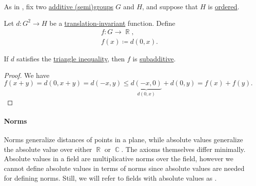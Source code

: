\begin{proposition}\label{thm:triangle_inequality_to_subadditivity}
  As in , fix two \hyperref[con:additive_semigroup]{additive (semi)groups} \( G \) and \( H \), and suppose that \( H \) is \hyperref[def:ordered_semigroup]{ordered}.

  Let \( d: G^2 \to H \) be a \hyperref[def:translation_invariant_binary_function]{translation-invariant} function. Define
  \begin{equation*}
    \begin{aligned}
      &f: G \to \BbbR, \\
      &f(x) \coloneqq d(0, x).
    \end{aligned}
  \end{equation*}

  If \( d \) satisfies the \hyperref[def:triangle_inequality]{triangle inequality}, then \( f \) is \hyperref[def:additive_function/sub]{subadditive}.
\end{proposition}
\begin{proof}
  We have
  \begin{equation*}
    f(x + y) = d(0, x + y) = d(-x, y) \leq \underbrace{d(-x, 0)}_{d(0, x)} + d(0, y) = f(x) + f(y).
  \end{equation*}
\end{proof}

\paragraph{Norms}

\begin{remark}\label{rem:normed_fields}
  Norms generalize distances of points in a plane, while absolute values generalize the absolute value over either \( \BbbR \) or \( \BbbC \). The axioms themselves differ minimally. Absolute values in a field are multiplicative norms over the field, however we cannot define absolute values in terms of norms since absolute values are needed for defining norms. Still, we will refer to fields with absolute values as .
\end{remark}

